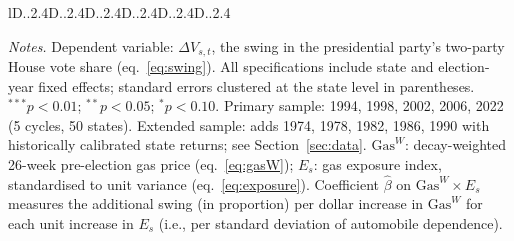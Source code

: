 \documentclass[12pt]{article}
\begin{document}
\begin{table}[!htbp]
\begin{threeparttable}
\begin{tabular}{lD{.}{.}{2.4}D{.}{.}{2.4}D{.}{.}{2.4}D{.}{.}{2.4}D{.}{.}{2.4}D{.}{.}{2.4}}
\bottomrule
\end{tabular}
\begin{tablenotes}
\footnotesize
\item \textit{Notes.} Dependent variable: $\Delta V_{s,t}$, the swing in the presidential party's two-party House vote share (eq.~\ref{eq:swing}). All specifications include state and election-year fixed effects; standard errors clustered at the state level in parentheses. $^{***}p<0.01$; $^{**}p<0.05$; $^{*}p<0.10$. Primary sample: 1994, 1998, 2002, 2006, 2022 (5 cycles, 50 states). Extended sample: adds 1974, 1978, 1982, 1986, 1990 with historically calibrated state returns; see Section~\ref{sec:data}. $\mathrm{Gas}^W$: decay-weighted 26-week pre-election gas price (eq.~\ref{eq:gasW}); $E_s$: gas exposure index, standardised to unit variance (eq.~\ref{eq:exposure}). Coefficient $\hat\beta$ on $\mathrm{Gas}^W \times E_s$ measures the additional swing (in proportion) per dollar increase in $\mathrm{Gas}^W$ for each unit increase in $E_s$ (i.e., per standard deviation of automobile dependence).
\end{tablenotes}
\end{threeparttable}
\end{table}
\end{document}
